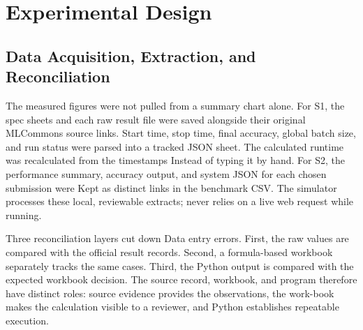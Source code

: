 \documentclass[final,3p,12pt,nopreprintline]{elsarticle}
\begin{document}
\section{Experimental Design}


\subsection{Data Acquisition, Extraction, and Reconciliation}


The measured figures were not pulled from a summary chart alone. For S1, the spec sheets and each raw result file were saved alongside their original MLCommons source links. Start time, stop time, final accuracy, global batch size, and run status were parsed into a tracked JSON sheet. The calculated runtime was recalculated from the timestamps Instead of typing it by hand. For S2, the performance summary, accuracy output, and system JSON for each chosen submission were Kept as distinct links in the benchmark CSV. The simulator processes these local, reviewable extracts; never relies on a live web request while running.


Three reconciliation layers cut down Data entry errors. First, the raw values are compared with the official result records. Second, a formula-based workbook separately tracks the same cases. Third, the Python output is compared with the expected workbook decision. The source record, workbook, and program therefore have distinct roles: source evidence provides the observations, the work-book makes the calculation visible to a reviewer, and Python establishes repeatable execution.
\end{document}
